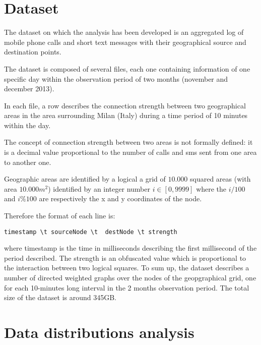 \section{Dataset}
\label{thedataset}

The dataset on which the analysis has been developed is an aggregated log of mobile phone
calls and short text messages with their geographical source and destination points.

The dataset is composed of several files, each one containing information of one specific day
within the observation period of two months (november and december 2013).


In each file, a row describes the connection strength between two geographical areas in the area surrounding Milan (Italy) during a time period of 10 minutes within the day.

The concept of connection strength between two areas is not formally defined: it is a decimal value proportional to the number of calls and sms sent from one area to another one.

Geographic areas are identified by a logical a grid of $10.000$ squared areas 
(with area $10.000m^2$) 
identified by an integer number $i \in [0, 9999]$ where the
$ i / 100 $ and $ i \% 100 $ are respectively the  
x and y coordinates of the node.

Therefore the format of each line is:

\begin{verbatim}
timestamp \t sourceNode	\t 	destNode \t strength
\end{verbatim}

where timestamp is the time in milliseconds describing the first millisecond of the period described.
The strength is an obfuscated value which is proportional to the interaction between two logical squares.
To sum up, the dataset describes a number of directed weighted graphs over
the nodes of the geopgraphical grid, one for each 10-minutes long interval
in the 2 months observation period. The total size of the dataset is around 345GB.


\section{Data distributions analysis}
\label{ds_analysis}


